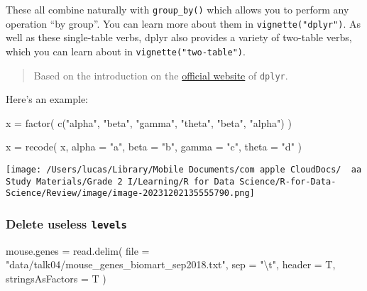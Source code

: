 \documentclass[
]{article}
\newenvironment{Shaded}{}{}
\newcommand{\AttributeTok}[1]{\textcolor[rgb]{0.49,0.56,0.16}{#1}}
\newcommand{\FunctionTok}[1]{\textcolor[rgb]{0.02,0.16,0.49}{#1}}
\newcommand{\NormalTok}[1]{#1}
\newcommand{\OtherTok}[1]{\textcolor[rgb]{0.00,0.44,0.13}{#1}}
\newcommand{\SpecialCharTok}[1]{\textcolor[rgb]{0.25,0.44,0.63}{#1}}
\newcommand{\StringTok}[1]{\textcolor[rgb]{0.25,0.44,0.63}{#1}}
\begin{document}
These all combine naturally with \texttt{group\_by()} which allows you
to perform any operation ``by group''. You can learn more about them in
\texttt{vignette("dplyr")}. As well as these single-table verbs, dplyr
also provides a variety of two-table verbs, which you can learn about in
\texttt{vignette("two-table")}.

\begin{quote}
Based on the introduction on the
\href{https://dplyr.tidyverse.org}{official website} of \texttt{dplyr}.
\end{quote}

Here's an example:

\begin{Shaded}
\begin{Highlighting}[]
\NormalTok{x }\OtherTok{=}
  \FunctionTok{factor}\NormalTok{(}
    \FunctionTok{c}\NormalTok{(}\StringTok{"alpha"}\NormalTok{, }\StringTok{"beta"}\NormalTok{, }\StringTok{"gamma"}\NormalTok{, }\StringTok{"theta"}\NormalTok{, }\StringTok{"beta"}\NormalTok{, }\StringTok{"alpha"}\NormalTok{)}
\NormalTok{  )}

\NormalTok{x }\OtherTok{=}
  \FunctionTok{recode}\NormalTok{(}
\NormalTok{    x,}
    \AttributeTok{alpha =} \StringTok{"a"}\NormalTok{,}
    \AttributeTok{beta =} \StringTok{"b"}\NormalTok{,}
    \AttributeTok{gamma =} \StringTok{"c"}\NormalTok{,}
    \AttributeTok{theta =} \StringTok{"d"}
\NormalTok{  )}
\end{Highlighting}
\end{Shaded}

\texttt{[image: /Users/lucas/Library/Mobile Documents/com~apple~CloudDocs/~~aa Study Materials/Grade 2 I/Learning/R for Data Science/R-for-Data-Science/Review/image/image-20231202135555790.png]}

\hypertarget{delete-useless-levels}{%
\subsubsection{\texorpdfstring{Delete useless
\texttt{levels}}{Delete useless levels}}\label{delete-useless-levels}}

\begin{Shaded}
\begin{Highlighting}[]
\NormalTok{mouse.genes }\OtherTok{=}
  \FunctionTok{read.delim}\NormalTok{(}
    \AttributeTok{file =} \StringTok{"data/talk04/mouse\_genes\_biomart\_sep2018.txt"}\NormalTok{,}
    \AttributeTok{sep =} \StringTok{"}\SpecialCharTok{\textbackslash{}t}\StringTok{"}\NormalTok{,}
    \AttributeTok{header =}\NormalTok{ T, }
    \AttributeTok{stringsAsFactors =}\NormalTok{ T }
\NormalTok{  )}
\end{Highlighting}
\end{Shaded}
\end{document}

